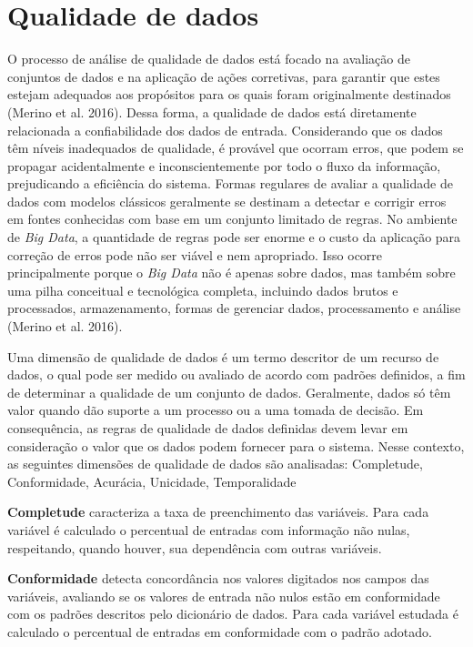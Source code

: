 \documentclass[
  12,
  table]{proadi}
\author{}
\date{\vspace{-2.5em}}
\begin{document}
\hypertarget{qualidade-de-dados}{%
\section{Qualidade de dados}\label{qualidade-de-dados}}

O processo de análise de qualidade de dados está focado na avaliação de
conjuntos de dados e na aplicação de ações corretivas, para garantir que
estes estejam adequados aos propósitos para os quais foram originalmente
destinados (Merino et al. 2016). Dessa forma, a qualidade de dados está
diretamente relacionada a confiabilidade dos dados de entrada.
Considerando que os dados têm níveis inadequados de qualidade, é
provável que ocorram erros, que podem se propagar acidentalmente e
inconscientemente por todo o fluxo da informação, prejudicando a
eficiência do sistema. Formas regulares de avaliar a qualidade de dados
com modelos clássicos geralmente se destinam a detectar e corrigir erros
em fontes conhecidas com base em um conjunto limitado de regras. No
ambiente de \emph{Big Data}, a quantidade de regras pode ser enorme e o
custo da aplicação para correção de erros pode não ser viável e nem
apropriado. Isso ocorre principalmente porque o \emph{Big Data} não é
apenas sobre dados, mas também sobre uma pilha conceitual e tecnológica
completa, incluindo dados brutos e processados, armazenamento, formas de
gerenciar dados, processamento e análise (Merino et al. 2016).

Uma dimensão de qualidade de dados é um termo descritor de um recurso de
dados, o qual pode ser medido ou avaliado de acordo com padrões
definidos, a fim de determinar a qualidade de um conjunto de dados.
Geralmente, dados só têm valor quando dão suporte a um processo ou a uma
tomada de decisão. Em consequência, as regras de qualidade de dados
definidas devem levar em consideração o valor que os dados podem
fornecer para o sistema. Nesse contexto, as seguintes dimensões de
qualidade de dados são analisadas: Completude, Conformidade, Acurácia,
Unicidade, Temporalidade

\textbf{Completude} caracteriza a taxa de preenchimento das variáveis.
Para cada variável é calculado o percentual de entradas com informação
não nulas, respeitando, quando houver, sua dependência com outras
variáveis.

\textbf{Conformidade} detecta concordância nos valores digitados nos
campos das variáveis, avaliando se os valores de entrada não nulos estão
em conformidade com os padrões descritos pelo dicionário de dados. Para
cada variável estudada é calculado o percentual de entradas em
conformidade com o padrão adotado.
\end{document}
